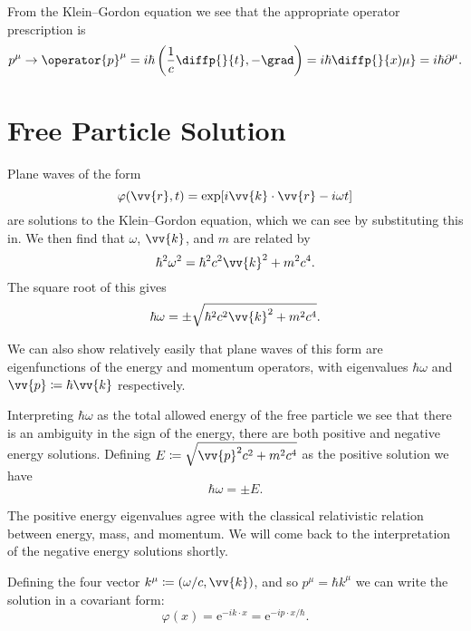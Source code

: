 \documentclass[fleqn]{NotesClass}
\newcommand*{\e}{\mathrm{e}}
\begin{document}
    From the Klein--Gordon equation we see that the appropriate operator prescription is
    \begin{equation}
        p^\mu \to \operator{p}^\mu = i\hbar\left( \frac{1}{c}\diffp{}{t}, -\grad \right) = i\hbar\diffp{}{x)\mu} = i\hbar\partial^\mu.
    \end{equation}
    
    \section{Free Particle Solution}
    Plane waves of the form
    \begin{equation}
        \varphi(\vv{r}, t) = \exp[i\vv{k}\cdot\vv{r} - i\omega t]
    \end{equation}
    are solutions to the Klein--Gordon equation, which we can see by substituting this in.
    We then find that \(\omega\), \(\vv{k}\), and \(m\) are related by
    \begin{equation}
        \hbar^2\omega^2 = \hbar^2c^2\vv{k}^2 + m^2c^4.
    \end{equation}
    The square root of this gives
    \begin{equation}
        \hbar\omega = \pm \sqrt{\hbar^2c^2\vv{k}^2 + m^2c^4}.
    \end{equation}
    
    We can also show relatively easily that plane waves of this form are eigenfunctions of the energy and momentum operators, with eigenvalues \(\hbar\omega\) and \(\vv{p} \coloneqq \hbar\vv{k}\) respectively.
    
    Interpreting \(\hbar\omega\) as the total allowed energy of the free particle we see that there is an ambiguity in the sign of the energy, there are both positive and negative energy solutions.
    Defining \(E \coloneqq \sqrt{\vv{p}^2c^2 + m^2c^4}\) as the positive solution we have
    \begin{equation}
        \hbar\omega = \pm E.
    \end{equation}
    
    The positive energy eigenvalues agree with the classical relativistic relation between energy, mass, and momentum.
    We will come back to the interpretation of the negative energy solutions shortly.
    
    Defining the four vector \(k^\mu \coloneqq (\omega/c, \vv{k})\), and so \(p^\mu = \hbar k^\mu\) we can write the solution in a covariant form:
    \begin{equation}
        \varphi(x) = \e^{-ik\cdot x} = \e^{-ip\cdot x / \hbar}.
    \end{equation}
    
\end{document}

